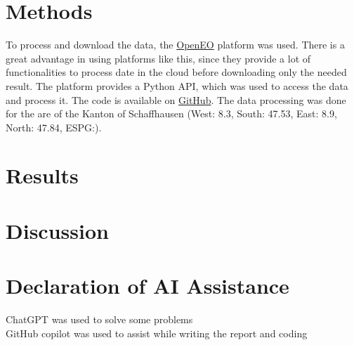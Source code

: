 \documentclass{article}
\begin{document}
\section*{Methods}

To process and download the data, the \href{https://openeo.dataspace.copernicus.eu/}{OpenEO} platform was used. There is a
great advantage in using platforms like this, since they provide a lot of functionalities to process date in the cloud
before downloading only the needed result. The platform provides a Python API, which was used to access the data and process it.
The code is available on \href{}{GitHub}. The data processing was done for the are of the Kanton of Schaffhausen
(West: 8.3, South: 47.53, East: 8.9, North: 47.84, ESPG:). 

\section*{Results}


\section*{Discussion}


\vfill
\section*{Declaration of AI Assistance}
ChatGPT was used to solve some problems\\
GitHub copilot was used to assist while writing the report and coding
\end{document}
